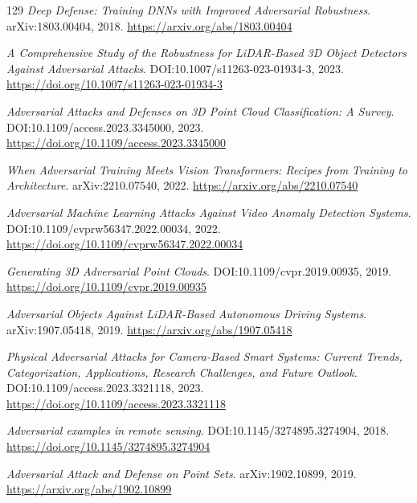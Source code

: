 \documentclass[11pt,a4paper]{article}
\begin{document}
\begin{thebibliography}{129}
\newblock \emph{Deep Defense: Training DNNs with Improved Adversarial Robustness}.
\newblock arXiv:1803.00404, 2018.
\newblock \url{https://arxiv.org/abs/1803.00404}

\newblock \emph{A Comprehensive Study of the Robustness for LiDAR-Based 3D Object Detectors Against Adversarial Attacks}.
\newblock DOI:10.1007/s11263-023-01934-3, 2023.
\newblock \url{https://doi.org/10.1007/s11263-023-01934-3}

\newblock \emph{Adversarial Attacks and Defenses on 3D Point Cloud Classification: A Survey}.
\newblock DOI:10.1109/access.2023.3345000, 2023.
\newblock \url{https://doi.org/10.1109/access.2023.3345000}

\newblock \emph{When Adversarial Training Meets Vision Transformers: Recipes from Training to Architecture}.
\newblock arXiv:2210.07540, 2022.
\newblock \url{https://arxiv.org/abs/2210.07540}

\newblock \emph{Adversarial Machine Learning Attacks Against Video Anomaly Detection Systems}.
\newblock DOI:10.1109/cvprw56347.2022.00034, 2022.
\newblock \url{https://doi.org/10.1109/cvprw56347.2022.00034}

\newblock \emph{Generating 3D Adversarial Point Clouds}.
\newblock DOI:10.1109/cvpr.2019.00935, 2019.
\newblock \url{https://doi.org/10.1109/cvpr.2019.00935}

\newblock \emph{Adversarial Objects Against LiDAR-Based Autonomous Driving Systems}.
\newblock arXiv:1907.05418, 2019.
\newblock \url{https://arxiv.org/abs/1907.05418}

\newblock \emph{Physical Adversarial Attacks for Camera-Based Smart Systems: Current Trends, Categorization, Applications, Research Challenges, and Future Outlook}.
\newblock DOI:10.1109/access.2023.3321118, 2023.
\newblock \url{https://doi.org/10.1109/access.2023.3321118}

\newblock \emph{Adversarial examples in remote sensing}.
\newblock DOI:10.1145/3274895.3274904, 2018.
\newblock \url{https://doi.org/10.1145/3274895.3274904}

\newblock \emph{Adversarial Attack and Defense on Point Sets}.
\newblock arXiv:1902.10899, 2019.
\newblock \url{https://arxiv.org/abs/1902.10899}


\end{thebibliography}
\end{document}
